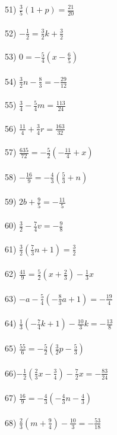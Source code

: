 \documentclass[12pt]{article}
\theoremstyle{definition}
\begin{document}
\begin{multicols}{2}
  51) $\frac{3}{5} (1 + p) = \frac{21}{20}$\\ \ \\
  52) $- \frac{1}{2} = \frac{3}{2} k + \frac{3}{2}$\\ \ \\
  53) $0 = - \frac{5}{4} (x - \frac{6}{5})$\\ \ \\
  54) $\frac{3}{2} n - \frac{8}{3} = - \frac{29}{12}$\\ \ \\
  55) $\frac{3}{4} - \frac{5}{4} m = \frac{113}{24}$\\ \ \\
  56) $\frac{11}{4} + \frac{3}{4} r = \frac{163}{32}$\\ \ \\
  57) $\frac{635}{72} = - \frac{5}{2} (- \frac{11}{4} + x)$\\ \ \\
  58) $- \frac{16}{9} = - \frac{4}{3} (\frac{5}{3} + n)$\\ \ \\
  59) $2 b + \frac{9}{5} = - \frac{11}{5}$\\ \ \\
  60) $\frac{3}{2} - \frac{7}{4} v = - \frac{9}{8}$\\ \ \\
  61) $\frac{3}{2} (\frac{7}{3} n + 1) = \frac{3}{2}$\\ \ \\
  62) $\frac{41}{9} = \frac{5}{2} (x + \frac{2}{3}) - \frac{1}{3} x$\\ \ \\
  63) $- a - \frac{5}{4} (- \frac{8}{3} a + 1) = - \frac{19}{4}$\\ \ \\
  64) $\frac{1}{3} (- \frac{7}{4} k + 1) - \frac{10}{3} k = - \frac{13}{8}$\\ \ \\
  65) $\frac{55}{6} = - \frac{5}{2} (\frac{3}{2} p - \frac{5}{3})$\\ \ \\
  66)$- \frac{1}{2} (\frac{2}{3} x - \frac{3}{4}) - \frac{7}{2} x = -\frac{83}{24}$\\ \ \\
  67) $\frac{16}{9} = - \frac{4}{3} (- \frac{4}{3} n - \frac{4}{3})$\\ \ \\
  68) $\frac{2}{3} (m + \frac{9}{4}) - \frac{10}{3} = - \frac{53}{18}$\\ \ \\

\end{multicols}
\end{document}
